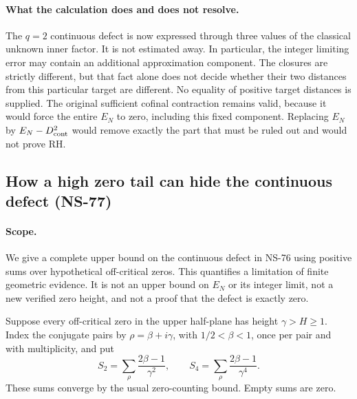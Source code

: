 \documentclass[11pt]{article}
\theoremstyle{remark}
\begin{document}
\paragraph{What the calculation does and does not resolve.}
The $q=2$ continuous defect is now expressed through three values of the
classical unknown inner factor. It is not estimated away. In particular,
the integer limiting error may contain an additional approximation
component. The closures are strictly different, but that fact alone
does not decide whether their two distances from this particular target
are different. No equality of positive target distances is supplied.
The original sufficient cofinal contraction remains valid, because it
would force the entire $E_N$ to zero, including this fixed component.
Replacing $E_N$ by $E_N-D_{\rm cont}^2$ would remove exactly the part
that must be ruled out and would not prove RH.

\subsection{How a high zero tail can hide the continuous defect (NS-77)}
\label{sec:ns77-continuous-tail}

\paragraph{Scope.}
We give a complete upper bound on the continuous defect in NS-76 using
positive sums over hypothetical off-critical zeros. This quantifies a
limitation of finite geometric evidence. It is not an upper bound on
$E_N$ or its integer limit, not a new verified zero height, and not a
proof that the defect is exactly zero.

Suppose every off-critical zero in the upper half-plane has height
$\gamma>H\geq1$. Index the conjugate pairs by $\rho=\beta+i\gamma$,
with $1/2<\beta<1$, once per pair and with multiplicity, and put
\[
 S_2=\sum_\rho\frac{2\beta-1}{\gamma^2},\qquad
 S_4=\sum_\rho\frac{2\beta-1}{\gamma^4}.
\]
These sums converge by the usual zero-counting bound. Empty sums are zero.
\end{document}
